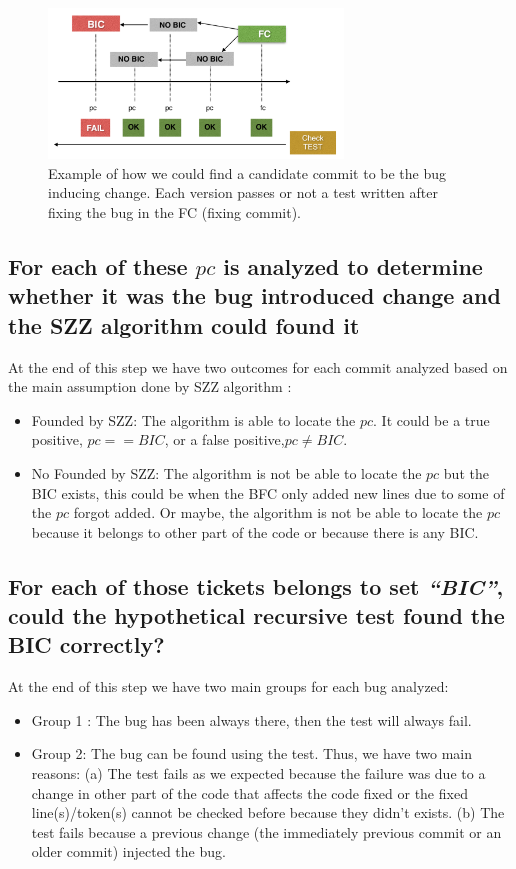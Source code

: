 \documentclass[conference]{IEEEtran}
\begin{document}
\begin{figure}[ht]
\centering
\includegraphics[height=4cm]{testrecursive.png}
\caption{Example of how we could find a candidate commit to be the  bug inducing change. Each version passes or not a test written after fixing the bug in the FC (fixing commit).}
\label{fig:test}      
\end{figure}


\subsection{For each of these $pc$ is analyzed to determine whether it was the bug introduced change and the SZZ algorithm could found it }

At the end of this step we have two outcomes for each commit analyzed based on the main assumption done by SZZ algorithm \cite{sliwerski2005changes}:
\begin{itemize}
	\item Founded by SZZ: The algorithm is able to locate the $pc$. It could be a true positive, $ pc == BIC $, or a false positive,$ pc \not= BIC $.
	\item No Founded by SZZ: The algorithm is not be able to locate the $pc$ but the BIC exists, this could be when the BFC only added new lines due to some of the $pc$ forgot added. Or maybe, the algorithm is not be able to locate the $pc$ because it belongs to other part of the code or because there is any BIC.
\end{itemize}


\subsection{For each of those tickets belongs to set \textit{``BIC''}, could the hypothetical recursive test found the BIC correctly?}

At the end of this step we have two main groups for each bug analyzed:
\begin{itemize}
	\item Group 1 : The bug has been always there, then the test will always fail.
	\item Group 2: The bug can be found using the test. Thus, we have two main reasons: (a) The test fails as we expected because the failure was due to a change in other part of the code that affects the code fixed or  the fixed line(s)/token(s) cannot be checked before because they didn't exists. (b) The test fails because a previous change (the immediately previous commit or an older commit) injected the bug.
\end{itemize}
\end{document}
